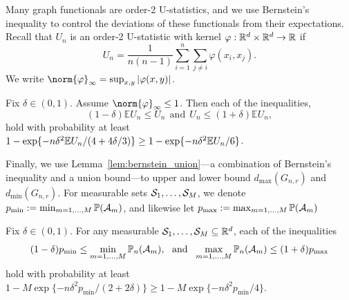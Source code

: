 Many graph functionals are order-2 U-statistics, and we use Bernstein's inequality to control the deviations of these functionals from their expectations. Recall that $U_n$ is an order-2 U-statistic with kernel $\varphi: \mathbb{R}^d \times \mathbb{R}^d \to \mathbb{R}$ if 
\begin{equation*}
U_n = \frac{1}{n(n-1)}\sum_{i = 1}^{n} \sum_{j \neq i} \varphi(x_i,x_j).
\end{equation*}
We write $\norm{\varphi}_{\infty} = \sup_{x,y} |\varphi(x,y)|$. 
\begin{lemma}
	\label{lem:hoeffding}
	Fix $\delta \in (0,1)$. Assume $\norm{\varphi}_{\infty} \leq 1$. Then each of the inequalities,
	\begin{equation*}
	(1 - \delta) \mathbb{E}U_n \leq U_n~~\textrm{and}~~ U_n\leq (1 + \delta) \mathbb{E}U_n,
	\end{equation*}
	hold with probability at least $1 - \exp\{-n\delta^2 \mathbb{E} U_n/(4 + 4\delta/3)\} \geq 1 - \exp\{-n\delta^2 \mathbb{E} U_n/6\}$.
\end{lemma}

Finally, we use Lemma~\ref{lem:bernstein_union}---a combination of Bernstein's inequality and a union bound---to upper and lower bound $d_{\max}(G_{n,r})$ and $d_{\min}(G_{n,r})$. For measurable sets $\mathcal{S}_1,\ldots,\mathcal{S}_M$, we denote $p_{\min} := \min_{m = 1,\ldots,M} \mathbb{P}(\mathcal{A}_m)$, and likewise let $p_{\max} := \max_{m = 1,\ldots,M} \mathbb{P}(\mathcal{A}_m)$
\begin{lemma}
	\label{lem:bernstein_union}
	Fix $\delta \in (0,1)$. For any measurable $\mathcal{S}_1,\ldots,\mathcal{S}_M \subseteq \mathbb{R}^d$, each of the inequalities
	\begin{equation*}
	(1 - \delta) p_{\min} \leq \min_{m = 1,\ldots,M} \mathbb{P}_n(\mathcal{A}_m),~~\textrm{and}~~\max_{m = 1,\ldots,M}  \mathbb{P}_n(\mathcal{A}_m) \leq (1 + \delta) p_{\max}
	\end{equation*}
	hold with probability at least $1 - M \exp \{-n\delta^2p_{\min}/(2 + 2\delta) \} \geq 1 - M \exp\{-n\delta^2p_{\min}/4\}$.  
\end{lemma}

